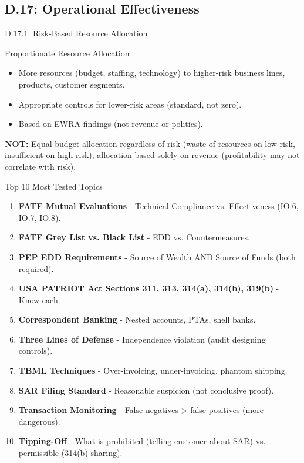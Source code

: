 \documentclass{beamer}
\begin{document}
	\subsection{D.17: Operational Effectiveness}
	
	\begin{frame}{D.17.1: Risk-Based Resource Allocation}
		\begin{block}{Proportionate Resource Allocation}
			\begin{itemize}
				\item More resources (budget, staffing, technology) to higher-risk business lines, products, customer segments.
				\item Appropriate controls for lower-risk areas (standard, not zero).
				\item Based on EWRA findings (not revenue or politics).
			\end{itemize}
		\end{block}
		\textbf{NOT:} Equal budget allocation regardless of risk (waste of resources on low risk, insufficient on high risk), allocation based solely on revenue (profitability may not correlate with risk).
	\end{frame}
	
	
	\begin{frame}{Top 10 Most Tested Topics}
		\begin{enumerate}
			\item \textbf{FATF Mutual Evaluations} - Technical Compliance vs. Effectiveness (IO.6, IO.7, IO.8).
			\item \textbf{FATF Grey List vs. Black List} - EDD vs. Countermeasures.
			\item \textbf{PEP EDD Requirements} - Source of Wealth AND Source of Funds (both required).
			\item \textbf{USA PATRIOT Act Sections 311, 313, 314(a), 314(b), 319(b)} - Know each.
			\item \textbf{Correspondent Banking} - Nested accounts, PTAs, shell banks.
			\item \textbf{Three Lines of Defense} - Independence violation (audit designing controls).
			\item \textbf{TBML Techniques} - Over-invoicing, under-invoicing, phantom shipping.
			\item \textbf{SAR Filing Standard} - Reasonable suspicion (not conclusive proof).
			\item \textbf{Transaction Monitoring} - False negatives > false positives (more dangerous).
			\item \textbf{Tipping-Off} - What is prohibited (telling customer about SAR) vs. permissible (314(b) sharing).
		\end{enumerate}
	\end{frame}
	
\end{document}

